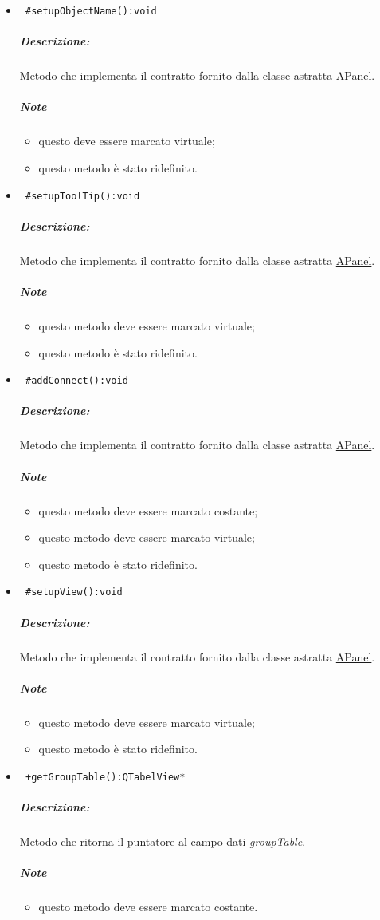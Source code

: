 \begin{itemize}
\item\color{blue}\verb! #setupObjectName():void!
\color{black}
\subparagraph{Descrizione:}Metodo che implementa il contratto fornito dalla classe astratta \hyperref[speAPanel]{APanel}.
 \subparagraph{Note}
 \begin{itemize}
  \item questo deve essere marcato virtuale;
 \item questo metodo è stato ridefinito.
 \end{itemize}
 
\item\color{blue}\verb! #setupToolTip():void!
\color{black}
\subparagraph{Descrizione:}Metodo che implementa il contratto fornito dalla classe astratta \hyperref[speAPanel]{APanel}.
 \subparagraph{Note}
 \begin{itemize}
 \item questo metodo deve essere marcato virtuale;
 \item questo metodo è stato ridefinito.
 \end{itemize}
 
\item\color{blue}\verb! #addConnect():void!
\color{black}
\subparagraph{Descrizione:}Metodo che implementa il contratto fornito dalla classe astratta \hyperref[speAPanel]{APanel}.
 \subparagraph{Note}
 \begin{itemize}
 \item questo metodo deve essere marcato costante;
 \item questo metodo deve essere marcato virtuale;
 \item questo metodo è stato ridefinito.
 \end{itemize}
 
\item\color{blue}\verb! #setupView():void!
\color{black}
\subparagraph{Descrizione:}Metodo che implementa il contratto fornito dalla classe astratta \hyperref[speAPanel]{APanel}.
 \subparagraph{Note}
 \begin{itemize}
 \item questo metodo deve essere marcato virtuale;
 \item questo metodo è stato ridefinito.
 \end{itemize}

\item\color{blue}\verb! +getGroupTable():QTabelView*!
\color{black}
\subparagraph{Descrizione:}Metodo che ritorna il puntatore al campo dati \emph{groupTable}.
 \subparagraph{Note}
 \begin{itemize}
 \item questo metodo deve essere marcato costante.
 \end{itemize}


\end{itemize}
